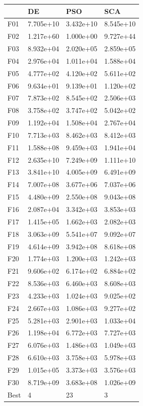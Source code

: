 \begin{tabular}{llll}
\toprule
{} &         DE &        PSO &        SCA \\
\midrule
F01  &  7.705e+10 &  3.432e+10 &  8.545e+10 \\
F02  &  1.217e+60 &  1.000e+00 &  9.727e+44 \\
F03  &  8.932e+04 &  2.020e+05 &  2.859e+05 \\
F04  &  2.976e+04 &  1.011e+04 &  1.588e+04 \\
F05  &  4.777e+02 &  4.120e+02 &  5.611e+02 \\
F06  &  9.634e+01 &  9.139e+01 &  1.120e+02 \\
F07  &  7.873e+02 &  8.545e+02 &  2.506e+03 \\
F08  &  3.758e+02 &  3.747e+02 &  5.042e+02 \\
F09  &  1.192e+04 &  1.508e+04 &  2.767e+04 \\
F10  &  7.713e+03 &  8.462e+03 &  8.412e+03 \\
F11  &  1.588e+08 &  9.459e+03 &  1.941e+04 \\
F12  &  2.635e+10 &  7.249e+09 &  1.111e+10 \\
F13  &  3.841e+10 &  4.005e+09 &  6.491e+09 \\
F14  &  7.007e+08 &  3.677e+06 &  7.037e+06 \\
F15  &  4.480e+09 &  2.550e+08 &  9.043e+08 \\
F16  &  2.087e+04 &  3.342e+03 &  3.853e+03 \\
F17  &  1.415e+05 &  1.662e+03 &  2.082e+03 \\
F18  &  3.063e+09 &  5.541e+07 &  9.092e+07 \\
F19  &  4.614e+09 &  3.942e+08 &  8.618e+08 \\
F20  &  1.774e+03 &  1.200e+03 &  1.242e+03 \\
F21  &  9.606e+02 &  6.174e+02 &  6.884e+02 \\
F22  &  8.536e+03 &  6.460e+03 &  8.608e+03 \\
F23  &  4.233e+03 &  1.024e+03 &  9.025e+02 \\
F24  &  2.667e+03 &  1.086e+03 &  9.277e+02 \\
F25  &  5.281e+03 &  2.901e+03 &  1.033e+04 \\
F26  &  1.198e+04 &  6.772e+03 &  7.727e+03 \\
F27  &  6.076e+03 &  1.486e+03 &  1.049e+03 \\
F28  &  6.610e+03 &  3.758e+03 &  5.978e+03 \\
F29  &  1.015e+05 &  3.373e+03 &  3.576e+03 \\
F30  &  8.719e+09 &  3.683e+08 &  1.026e+09 \\
Best &          4 &         23 &          3 \\
\bottomrule
\end{tabular}
